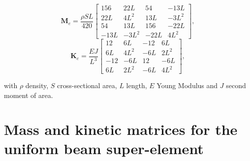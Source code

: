 \begin{equation}
	\mathbf{M}_e = \frac{\rho S L}{420}\begin{bmatrix}156 & 22L & 54 & -13L \\ 
																							22L & 4L^2 & 13L & -3L^2 \\
																							54 & 13L & 156 & -22L \\
																							-13L & -3L^2 & -22L & 4L^2 \end{bmatrix},	\label{eq:beam_mass}
\end{equation}
\begin{equation}
	\mathbf{K}_e = \frac{E J}{L^3}\begin{bmatrix}12 & 6L & -12 & 6L \\ 
																																										 6L & 4L^2 & -6L & 2L^2 \\
																																										 -12 & -6L & 12 & -6L \\
																																										 6L & 2L^2 & -6L & 4L^2\end{bmatrix},															\label{eq:beam_kin}
\end{equation}

with $\rho$ density, $S$ cross-sectional area, $L$ length, $E$ Young Modulus and $J$ second moment of area.

\section[Beam Super-Element]{Mass and kinetic matrices for the uniform beam super-element}
\label{chap:appendix3}

